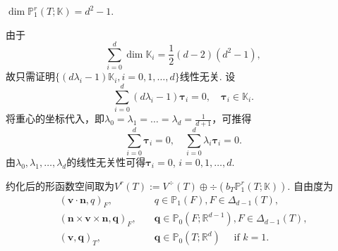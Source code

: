 \begin{lemma}
$\dim\mathbb P_1^r(T;\mathbb K)=d^2-1$.
\end{lemma}
\begin{prf}
由于
\begin{equation*}
\sum_{i=0}^d\dim\mathbb K_i=\frac{1}{2}(d-2)(d^2-1),
\end{equation*}
故只需证明$\{(d\lambda_i-1)\mathbb K_i, i=0,1,\ldots, d\}$线性无关. 设
\begin{equation*}
\sum_{i=0}^d(d\lambda_i-1)\boldsymbol{\tau}_i=0,\quad \boldsymbol{\tau}_i\in\mathbb K_i.
\end{equation*}
将重心的坐标代入，即$\lambda_0=\lambda_1=\ldots=\lambda_d=\frac{1}{d+1}$，可推得 
\begin{equation*}
\sum_{i=0}^d\boldsymbol{\tau}_i=0,\quad \sum_{i=0}^d\lambda_i\boldsymbol{\tau}_i=0.
\end{equation*}
由$\lambda_0,\lambda_1,\ldots,\lambda_d$的线性无关性可得$\boldsymbol{\tau}_i=0$, $i=0,1,\ldots, d$.
\end{prf}

约化后的形函数空间取为$V^r(T):=V^{\div}(T)\oplus\div(b_T\mathbb P_1^r(T;\mathbb K))$.
自由度为
\begin{subequations}\label{reducedivfreencfmDoFs}
\begin{align}
\label{reducedivfreencfmDoFs1}
(\boldsymbol{v}\cdot\boldsymbol{n}, q)_F, &\quad q\in\mathbb P_{1}(F), F\in\Delta_{d-1}(T),\\
\label{reducedivfreencfmDoFs2}
(\boldsymbol{n}\times\boldsymbol{v}\times\boldsymbol{n}, \boldsymbol{q})_F, &\quad \boldsymbol{q}\in\mathbb P_0(F;\mathbb R^{d-1}), F\in\Delta_{d-1}(T),\\
\label{reducedivfreencfmDoFs3}
(\boldsymbol{v}, \boldsymbol{q})_T, &\quad \boldsymbol{q}\in\mathbb P_{0}(T;\mathbb R^d)\quad\textrm{ if } k=1.
\end{align}
\end{subequations}

